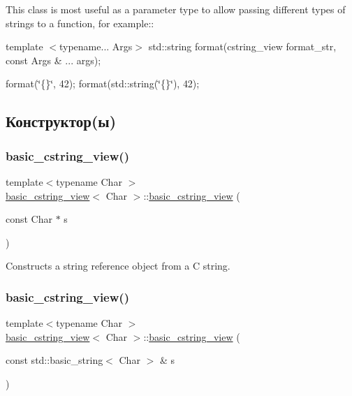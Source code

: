 This class is most useful as a parameter type to allow passing different types of strings to a function, for example\+:\+:

template $<$typename... Args$>$ std\+::string format(cstring\+\_\+view format\+\_\+str, const Args \& ... args);

format(\char`\"{}\{\}\char`\"{}, 42); format(std\+::string(\char`\"{}\{\}\char`\"{}), 42);  

\subsection{Конструктор(ы)}
\mbox{\label{classbasic__cstring__view_ab464b2378652892cec4716d3e3d475c7}} 
\subsubsection{\texorpdfstring{basic\+\_\+cstring\+\_\+view()}{basic\_cstring\_view()}\hspace{0.1cm}{\footnotesize\ttfamily [1/2]}}
{\footnotesize\ttfamily template$<$typename Char $>$ \\
\hyperlink{classbasic__cstring__view}{basic\+\_\+cstring\+\_\+view}$<$ Char $>$\+::\hyperlink{classbasic__cstring__view}{basic\+\_\+cstring\+\_\+view} (\begin{DoxyParamCaption}\item[{const Char $\ast$}]{s }\end{DoxyParamCaption})\hspace{0.3cm}{\ttfamily [inline]}}

Constructs a string reference object from a C string. \mbox{\label{classbasic__cstring__view_a10b92cc0e3e67789601984099b9ed339}} 
\subsubsection{\texorpdfstring{basic\+\_\+cstring\+\_\+view()}{basic\_cstring\_view()}\hspace{0.1cm}{\footnotesize\ttfamily [2/2]}}
{\footnotesize\ttfamily template$<$typename Char $>$ \\
\hyperlink{classbasic__cstring__view}{basic\+\_\+cstring\+\_\+view}$<$ Char $>$\+::\hyperlink{classbasic__cstring__view}{basic\+\_\+cstring\+\_\+view} (\begin{DoxyParamCaption}\item[{const std\+::basic\+\_\+string$<$ Char $>$ \&}]{s }\end{DoxyParamCaption})\hspace{0.3cm}{\ttfamily [inline]}}

